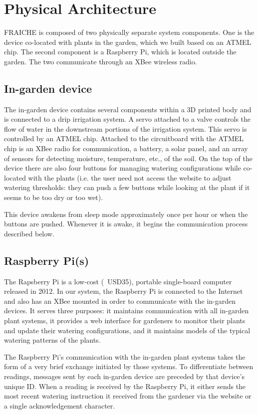 \documentclass[a4paper]{acm_proc_article-sp}
\makeatletter
\newcommand{\ie}{i.e.\@\xspace}
\newcommand{\etc}{etc.\@\xspace}
\makeatother
\begin{document}
\section{Physical Architecture}

FRAICHE is composed of two physically separate system components.  One is the device co-located with plants in the garden, which we built based on an ATMEL chip.  The second component is a Raspberry Pi, which is located outside the garden.  The two communicate through an XBee wireless radio.

\subsection{In-garden device}

The in-garden device contains several components within a 3D printed body and is connected to a drip irrigation system.  A servo attached to a valve controls the flow of water in the downstream portions of the irrigation system.  This servo is controlled by an ATMEL chip.  Attached to the circuitboard with the ATMEL chip is an XBee radio for communication, a battery, a solar panel, and an array of sensors for detecting moisture, temperature, \etc, of the soil.  On the top of the device there are also four buttons for managing watering configurations while co-located with the plants (\ie the user need not access the website to adjust watering thresholds: they can push a few buttons while looking at the plant if it seems to be too dry or too wet).

This device awakens from sleep mode approximately once per hour or when the buttons are pushed.  Whenever it is awake, it begins the communication process described below.

\subsection{Raspberry Pi(s)}

The Rapsberry Pi is a low-cost (~USD35), portable single-board computer released in 2012. In our system, the Raspberry Pi is connected to the Internet and also has an XBee mounted in order to communicate with the in-garden devices.  It serves three purposes: it maintains communication with all in-garden plant systems, it provides a web interface for gardeners to monitor their plants and update their watering configurations, and it maintains models of the typical watering patterns of the plants.

The Raspberry Pi's communication with the in-garden plant systems takes the form of a very brief exchange initiated by those systems.  To differentiate between readings, messages sent by each in-garden device are preceded by that device's unique ID.  When a reading is received by the Raspberry Pi, it either sends the most recent watering instruction it received from the gardener via the website or a single acknowledgement character.
\end{document}
